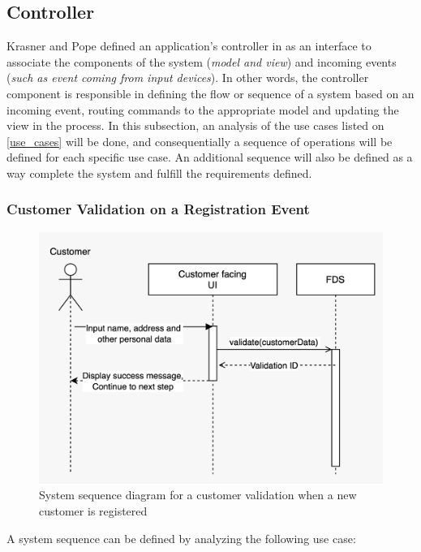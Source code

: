 \subsection{Controller}
 \label{subsection:controller}

Krasner and Pope defined an application's controller in \autocite{krasner-pope-88} as an interface to associate the components of the system (\emph{model and view}) and incoming events (\emph{such as event coming from input devices}). In other words, the controller component is responsible in defining the flow or sequence of a system based on an incoming event, routing commands to the appropriate model and updating the view in the process.
In this subsection, an analysis of the use cases listed on \autoref{use_cases} will be done, and consequentially a sequence of operations will be defined for each specific use case. An additional sequence will also be defined as a way complete the system and fulfill the requirements defined. 


\subsubsection{Customer Validation on a Registration Event}
 \label{subsection:regis}

\begin{figure}[!ht]
 \includegraphics[width=\textwidth]{diagrams/sequence_registration.jpeg}
 \caption{System sequence diagram for a customer validation when a new customer is registered}
 \label{fig:regis-sequence}
\end{figure}

A system sequence can be defined by analyzing the following use case:

